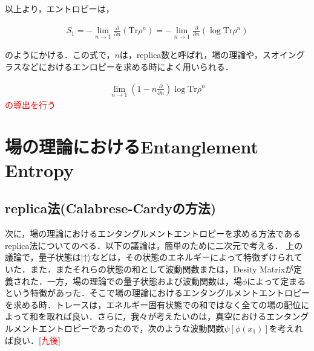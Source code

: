 以上より，エントロピーは，
\begin{empheqboxed}

  \begin{align}
    \label{replica}
    S_{1}=-\lim_{n \to 1}\frac{\partial}{\partial n}(\mathrm{Tr}\rho^n)=-\lim_{n \to 1}\frac{\partial}{\partial n}(\log\mathrm{Tr}\rho^{n})
  \end{align}

\end{empheqboxed}
のようにかける．この式で，$n$は，replica数と呼ばれ，場の理論や，スオイングラスなどにおけるエンロピーを求める時によく用いられる．

\begin{align}
  \lim_{n \to 1}(1-n\frac{\partial}{\partial n})\log \mathrm{Tr}\rho^{n}
\end{align}
\textcolor{red}{の導出を行う}
\section{場の理論におけるEntanglement Entropy\cite{15}\cite{16}\cite{17}\cite{18}}
\subsection{replica法(Calabrese-Cardyの方法)}
次に，場の理論におけるエンタングルメントエントロピーを求める方法であるreplica法についてのべる．以下の議論は，簡単のために二次元で考える．
上の議論で，量子状態は$\ket{\uparrow}$などは，その状態のエネルギーによって特徴ずけられていた．また．またそれらの状態の和として波動関数または，Desity Matrixが定義された．一方，場の理論での量子状態および波動関数は，場$\phi$によって定まるという特徴があった．そこで場の理論におけるエンタングルメントエントロピーを求める時．トレースは，エネルギー固有状態での和ではなく全ての場の配位によって和を取れば良い．さらに，我々が考えたいのは，真空におけるエンタングルメントエントロピーであったので，次のような波動関数$\psi[\phi(x_{1})]$を考えれば良い．[\textcolor{red}{九後}]



